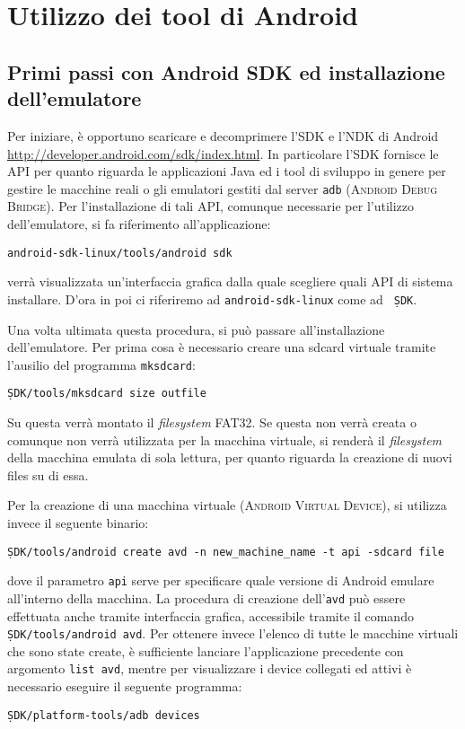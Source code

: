 \chapter{Utilizzo dei tool di Android}
\minitoc\mtcskip

\section{Primi passi con Android SDK ed installazione dell'emulatore}\label{sec:SDKStep}
Per iniziare, è opportuno scaricare e decomprimere l'SDK e l'NDK di Android
\url{http://developer.android.com/sdk/index.html}. In particolare l'SDK fornisce
le API per quanto riguarda le applicazioni Java ed i tool di sviluppo in genere
per gestire le macchine reali o gli emulatori gestiti dal server \texttt{\small adb}
(\textsc{Android Debug Bridge}).
Per l'installazione di tali API, comunque necessarie per l'utilizzo dell'emulatore,
si fa riferimento all'applicazione:
\begin{center}
\texttt{\small{android-sdk-linux/tools/android sdk}}
\end{center}
verrà visualizzata un'interfaccia grafica dalla quale scegliere quali API
di sistema installare. D'ora in poi ci riferiremo ad \texttt{\small{android-sdk-linux}}
come ad \texttt{\small{ \d SDK}}.


Una volta ultimata questa procedura, si può passare all'installazione dell'emulatore.
Per prima cosa è necessario creare una sdcard virtuale tramite l'ausilio del programma
\texttt{\small{mksdcard}}:
\begin{center}
\texttt{\small{\d SDK/tools/mksdcard size outfile}}
\end{center}
Su questa verrà montato il \textit{filesystem} FAT32.
Se questa non verrà creata o comunque non verrà utilizzata per la macchina virtuale,
si renderà il \textit{filesystem} della macchina emulata di sola lettura, per quanto
riguarda la creazione di nuovi files su di essa. 

Per la creazione di una macchina virtuale (\textsc{Android Virtual Device}), si utilizza invece il seguente binario:
\begin{center}
\texttt{\small{\d SDK/tools/android create avd -n new\_machine\_name -t api -sdcard file}}
\end{center}
dove il parametro \texttt{\small{api}} serve per specificare quale versione di 
Android emulare all'interno della macchina. La procedura di creazione dell'\texttt{\small{avd}}
può essere effettuata anche tramite interfaccia grafica, accessibile tramite
il comando \texttt{\small{\d SDK/tools/android avd}}. Per ottenere invece l'elenco
di tutte le macchine virtuali che sono state create, è sufficiente 
lanciare l'applicazione precedente con argomento \texttt{\small{list avd}},
mentre per visualizzare i device collegati ed attivi è necessario eseguire il seguente
programma:
\begin{center}
\texttt{\small{\d SDK/platform-tools/adb devices}}
\end{center}

